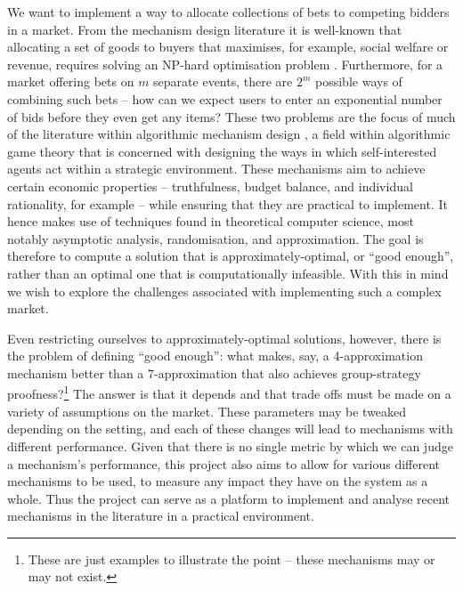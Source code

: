 \documentclass[10pt,a4paper]{article}
\theoremstyle{plain}
\theoremstyle{definition}
\begin{document}
	We want to implement a way to allocate collections of bets to competing
	bidders in a market. From the mechanism design literature it is well-known
	that allocating a set of goods to buyers that maximises, for example,
	social welfare or revenue, requires solving an NP-hard optimisation problem
	\cite{VCGNPhard}.  Furthermore, for a market offering bets on $m$ separate
	events, there are $2^m$ possible ways of combining such bets -- how can we
	expect users to enter an exponential number of bids before they even get
	any items? These two problems are the focus of much of the literature
	within algorithmic mechanism design \cite{Nisan2001}, a field within
	algorithmic game theory that is concerned with designing the ways in which
	self-interested agents act within a strategic environment. These mechanisms
	aim to achieve certain economic properties -- truthfulness, budget balance,
	and individual rationality, for example -- while ensuring that they are
	practical to implement. It hence makes use of techniques found in
	theoretical computer science, most notably asymptotic analysis,
	randomisation, and approximation. The goal is therefore to compute a
	solution that is approximately-optimal, or ``good enough'', rather than an
	optimal one that is computationally infeasible. With this in mind we wish
	to explore the challenges associated with implementing such a complex
	market.

	Even restricting ourselves to approximately-optimal solutions, however,
	there is the problem of defining ``good enough'': what makes, say, a
	4-approximation mechanism better than a 7-approximation that also achieves
	group-strategy proofness?\footnote{These are just examples to illustrate
	the point -- these mechanisms may or may not exist.} The answer is that it
	depends and that trade offs must be made on a variety of assumptions on the
	market. These parameters may be tweaked depending on the setting, and each
	of these changes will lead to mechanisms with different performance. Given
	that there is no single metric by which we can judge a mechanism's
	performance, this project also aims to allow for various different
	mechanisms to be used, to measure any impact they have on the system as a
	whole. Thus the project can serve as a platform to implement and analyse
	recent mechanisms in the literature in a practical environment.
\end{document}
